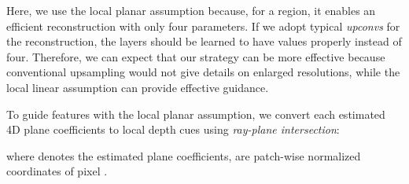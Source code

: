 \documentclass[10pt,twocolumn,letterpaper]{article}
\begin{document}
Here, we use the local planar assumption because, for a  region, it enables an efficient reconstruction with only four parameters.
If we adopt typical \textit{upconvs} for the reconstruction, the layers should be learned to have  values properly instead of four.
Therefore, we can expect that our strategy can be more effective because conventional upsampling would not give details on enlarged resolutions, while the local linear assumption can provide effective guidance.

To guide features with the local planar assumption, we convert each estimated 4D plane coefficients to  local depth cues using \textit{ray-plane intersection}:

where  denotes the estimated plane coefficients,  are  patch-wise normalized coordinates of pixel .

\begin{table}[t]
	\centering
{}
\end{table}
\end{document}
